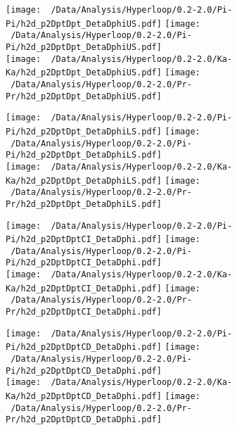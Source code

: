 \documentclass[ALICE,manyauthors]{ALICE_analysis_notes}
\begin{document}
\begin{figure}[h!]
	\texttt{[image: ~/Data/Analysis/Hyperloop/0.2-2.0/Pi-Pi/h2d\_p2DptDpt\_DetaDphiUS.pdf]}
	\texttt{[image: ~/Data/Analysis/Hyperloop/0.2-2.0/Pi-Pi/h2d\_p2DptDpt\_DetaDphiUS.pdf]}
	\\
	\texttt{[image: ~/Data/Analysis/Hyperloop/0.2-2.0/Ka-Ka/h2d\_p2DptDpt\_DetaDphiUS.pdf]}
	\texttt{[image: ~/Data/Analysis/Hyperloop/0.2-2.0/Pr-Pr/h2d\_p2DptDpt\_DetaDphiUS.pdf]}
	\\
\end{figure}
\begin{figure}[h!]
\texttt{[image: ~/Data/Analysis/Hyperloop/0.2-2.0/Pi-Pi/h2d\_p2DptDpt\_DetaDphiLS.pdf]}
\texttt{[image: ~/Data/Analysis/Hyperloop/0.2-2.0/Pi-Pi/h2d\_p2DptDpt\_DetaDphiLS.pdf]}
\\
\texttt{[image: ~/Data/Analysis/Hyperloop/0.2-2.0/Ka-Ka/h2d\_p2DptDpt\_DetaDphiLS.pdf]}
\texttt{[image: ~/Data/Analysis/Hyperloop/0.2-2.0/Pr-Pr/h2d\_p2DptDpt\_DetaDphiLS.pdf]}
\\
\end{figure}
\begin{figure}[h!]
\texttt{[image: ~/Data/Analysis/Hyperloop/0.2-2.0/Pi-Pi/h2d\_p2DptDptCI\_DetaDphi.pdf]}
\texttt{[image: ~/Data/Analysis/Hyperloop/0.2-2.0/Pi-Pi/h2d\_p2DptDptCI\_DetaDphi.pdf]}
\\
\texttt{[image: ~/Data/Analysis/Hyperloop/0.2-2.0/Ka-Ka/h2d\_p2DptDptCI\_DetaDphi.pdf]}
\texttt{[image: ~/Data/Analysis/Hyperloop/0.2-2.0/Pr-Pr/h2d\_p2DptDptCI\_DetaDphi.pdf]}
\\
\end{figure}
\begin{figure}[h!]
\texttt{[image: ~/Data/Analysis/Hyperloop/0.2-2.0/Pi-Pi/h2d\_p2DptDptCD\_DetaDphi.pdf]}
\texttt{[image: ~/Data/Analysis/Hyperloop/0.2-2.0/Pi-Pi/h2d\_p2DptDptCD\_DetaDphi.pdf]}
\\
\texttt{[image: ~/Data/Analysis/Hyperloop/0.2-2.0/Ka-Ka/h2d\_p2DptDptCD\_DetaDphi.pdf]}
\texttt{[image: ~/Data/Analysis/Hyperloop/0.2-2.0/Pr-Pr/h2d\_p2DptDptCD\_DetaDphi.pdf]}
\\
\end{figure}
\end{document}
